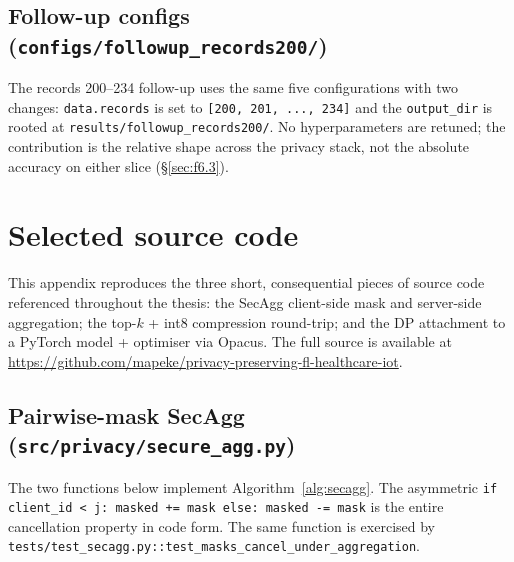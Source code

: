 \documentclass[11pt,a4paper]{report}
\begin{document}
\section{Follow-up configs (\texttt{configs/followup\_records200/})}\label{app:cfg-followup}

The records 200--234 follow-up uses the same five configurations with
two changes: \texttt{data.records} is set to \texttt{[200, 201, ...,
234]} and the \texttt{output\_dir} is rooted at
\texttt{results/followup\_records200/}. No hyperparameters are
retuned; the contribution is the relative shape across the privacy
stack, not the absolute accuracy on either slice
(\S\ref{sec:f6.3}).

\chapter{Selected source code}\label{app:code}

This appendix reproduces the three short, consequential pieces of
source code referenced throughout the thesis: the SecAgg client-side
mask and server-side aggregation; the top-$k$ + int8 compression
round-trip; and the DP attachment to a PyTorch model + optimiser via
Opacus. The full source is available at
\url{https://github.com/mapeke/privacy-preserving-fl-healthcare-iot}.

\section{Pairwise-mask SecAgg (\texttt{src/privacy/secure\_agg.py})}\label{lst:secagg}

The two functions below implement Algorithm~\ref{alg:secagg}. The
asymmetric \texttt{if client\_id < j: masked += mask else: masked -=
mask} is the entire cancellation property in code form. The same
function is exercised by
\texttt{tests/test\_secagg.py::test\_masks\_cancel\_under\_aggregation}.
\end{document}
